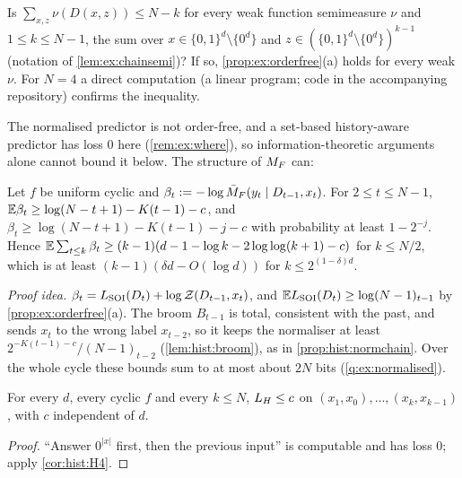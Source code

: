 \begin{question}\label{q:ex:depthweak}
Is $\sum_{x,z}\nu(D(x,z))\le N-k$ for every weak function semimeasure $\nu$ and $1\le k\le N-1$, the sum over $x\in\{0,1\}^d\setminus\{0^d\}$ and $z\in(\{0,1\}^d\setminus\{0^d\})^{k-1}$ (notation of \cref{lem:ex:chainsemi})? If so, \cref{prop:ex:orderfree}(a) holds for every weak $\nu$. For $N=4$ a direct computation (a linear program; code in the accompanying repository) confirms the inequality.
\end{question}

The normalised predictor is not order-free, and a set-based history-aware predictor has loss $0$ here (\cref{rem:ex:where}), so information-theoretic arguments alone cannot bound it below. The structure of $M_{F}$ can:

\begin{proposition}\label{prop:ex:normalised}
Let $f$ be uniform cyclic and $\beta_t:=-\log\bar{M}_{F}(y_t\mid D_{t-1},x_t)$. For $2\le t\le N-1$, $\mathbb{E}\beta_t\ge\log(N-t+1)-K(t-1)-c$, and $\beta_t\ge\log(N-t+1)-K(t-1)-j-c$ with probability at least $1-2^{-j}$. Hence $\mathbb{E}\sum_{t\le k}\beta_t\ge(k-1)(d-1-\log k-2\log\log(k+1)-c)$ for $k\le N/2$, which is at least $(k-1)(\delta d-O(\log d))$ for $k\le2^{(1-\delta)d}$.
\end{proposition}

\emph{Proof idea.} $\beta_t=L_{\mathrm{SOI}}(D_t)+\log\mathcal{Z}(D_{t-1},x_t)$, and $\mathbb{E}L_{\mathrm{SOI}}(D_t)\ge\log(N-1)_{t-1}$ by \cref{prop:ex:orderfree}(a). The broom $B_{t-1}$ is total, consistent with the past, and sends $x_t$ to the wrong label $x_{t-2}$, so it keeps the normaliser at least $2^{-K(t-1)-c}/(N-1)_{t-2}$ (\cref{lem:hist:broom}), as in \cref{prop:hist:normchain}. Over the whole cycle these bounds sum to at most about $2N$ bits (\cref{q:ex:normalised}).

\begin{proposition}[\SFIhist]\label{prop:ex:cychist}
For every $d$, every cyclic $f$ and every $k\le N$, $L_{H}\le c$ on $(x_1,x_0),\dots,(x_k,x_{k-1})$, with $c$ independent of $d$.
\end{proposition}

\begin{proof}
``Answer $0^{|x|}$ first, then the previous input'' is computable and has loss $0$; apply \cref{cor:hist:H4}.
\end{proof}

